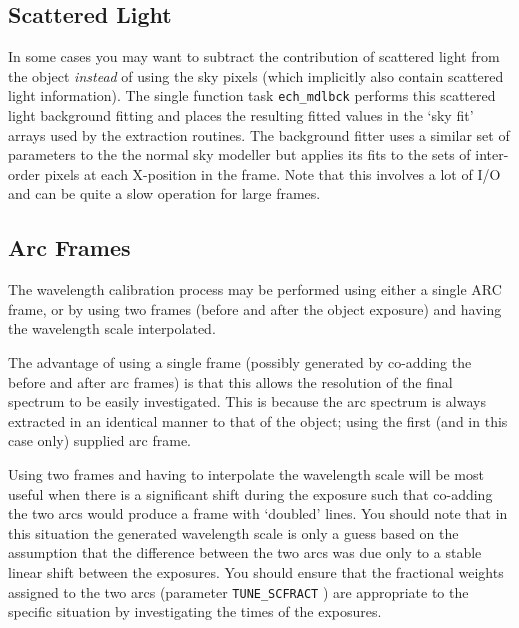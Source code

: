 \documentclass[11pt,twoside]{article}
\makeatletter
\newcommand{\htmlref}[2]{#1}
\newcommand{\xlabel}[1]{}
\newcommand{\mlabel}[1]{\xlabel{#1}\label{#1}}
\newcommand{\myindex}[1]{\index{#1}}
\newcommand{\indexcmdname}[1]{\index{#1@\protect\cmdname{#1}}}
\renewcommand{\myindex}[1]{}
\renewcommand{\indexcmdname}[1]{}
\newcommand{\cmdname}{\begingroup \catcode`\_=12 \realcmdname}
\newcommand{\realcmdname}[1]{\endgroup\texttt{#1}}
\makeatother
\begin{document}
\subsection{\mlabel{scattered_light}Scattered Light}
\myindex{Scattered light}

In some cases you may want to subtract the contribution of
scattered light from the object {\em instead} of using the sky pixels
(which implicitly also contain scattered light information). The
single function task \htmlref{{\tt ech\_mdlbck}}{ech_mdlbck}
performs this scattered light
background fitting and places the resulting fitted values in the `sky
fit' arrays used by the extraction routines. The background fitter
uses a similar set of parameters to the the normal sky modeller but
applies its fits to the sets of inter-order pixels at each X-position
in the frame. Note that this involves a lot of I/O and can be quite a
slow operation for large frames.
\indexcmdname{ECH_MDLBCK}


\subsection{\mlabel{arc_frames}Arc Frames}
\myindex{Arc frames}

The wavelength calibration process may be performed using either a
single ARC frame,  or by using two frames (before and after the
object exposure) and having the wavelength scale interpolated.

The advantage of using a single frame (possibly generated by
co-adding the before and after arc frames) is that this allows the
resolution of the final spectrum to be easily investigated. This is
because the arc spectrum is always extracted in an identical manner
to that of the object; using the first (and in this case only)
supplied arc frame.

Using two frames and having to interpolate the wavelength scale will
be most useful when there is a significant shift during the exposure
such that co-adding the two arcs would produce a frame with `doubled'
lines.
You should note that in this situation the generated
wavelength scale is only a guess based on the assumption that the
difference between the two arcs was due only to a stable linear
shift between the exposures.
You should ensure that the fractional weights assigned to the two arcs
(parameter \htmlref{{\tt{TUNE\_SCFRACT}}}{par_TUNE_SCFRACT}
\indexcmdname{TUNE_SCFRACT}) are appropriate to the specific situation
by investigating the times of the exposures.
\end{document}
